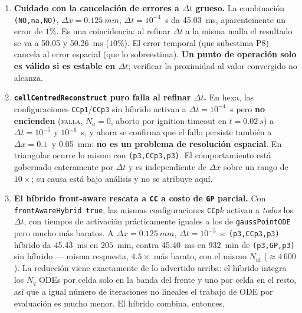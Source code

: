 \documentclass[11pt,a4paper]{article}
\newcommand{\code}[1]{\texttt{\small #1}}
\begin{document}
\begin{enumerate}[topsep=3pt,itemsep=3pt,leftmargin=1.5em]
        del valor convergido. En cambio $\Delta t=10^{-4}$~s \textbf{no} es
        suficiente: subestima P8 en $\sim\SI{4.6}{ms}$ ($10\%$) en la ruta de alto
        orden.
  \item \textbf{Cuidado con la cancelación de errores a $\Delta t$ grueso.} La
        combinación \code{(NO,na,NO)}, $\Delta x=\SI{0.125}{mm}$, $\Delta t=10^{-4}$~s
        da \SI{45.03}{ms}, aparentemente un error de $1\%$. Es una coincidencia: al
        refinar $\Delta t$ a la misma malla el resultado se va a \SI{50.05}{} y
        \SI{50.26}{ms} ($10\%$). El error temporal (que subestima P8) cancela al
        error espacial (que lo sobreestima). \textbf{Un punto de operación solo es
        válido si es estable en $\Delta t$}; verificar la proximidad al valor
        convergido no alcanza.
  \item \textbf{\code{cellCentredReconstruct} puro falla al refinar $\Delta t$.} En
        hexa, las configuraciones \code{CCp1}/\code{CCp3} sin híbrido activan a
        $\Delta t=10^{-4}$~s pero \textbf{no encienden} (\textsc{falla}, $N_a=0$,
        aborto por ignition-timeout en $t=\SI{0.02}{s}$) a $\Delta t=10^{-5}$ y
        $10^{-6}$~s, y ahora se confirma que el fallo persiste también a
        $\Delta x=\SI{0.1}{}$ y \SI{0.05}{mm}: \textbf{no es un problema de
        resolución espacial}. En triangular ocurre lo mismo con \code{(p3,CCp3,p3)}.
        El comportamiento está gobernado enteramente por $\Delta t$ y es
        independiente de $\Delta x$ sobre un rango de $10\times$; su causa está
        bajo análisis y no se atribuye aquí.
  \item \textbf{El híbrido front-aware rescata a \code{CC} a costo de \code{GP}
        parcial.} Con \code{frontAwareHybrid true}, las mismas configuraciones
        \code{CCp$k$} activan a \emph{todos} los $\Delta t$, con tiempos de
        activación prácticamente iguales a los de \code{gaussPointODE} pero mucho más
        baratos. A $\Delta x=\SI{0.125}{mm}$, $\Delta t=10^{-5}$~s:
        \code{(p3,CCp3,p3)} híbrido da \SI{45.43}{ms} en $205$~min, contra
        \SI{45.40}{ms} en $932$~min de \code{(p3,GP,p3)} sin híbrido --- misma
        respuesta, $4.5\times$ más barato, con el mismo $N_{\mathrm{nl}}$
        ($\approx 4\,600$). La reducción viene exactamente de lo advertido arriba: el
        híbrido integra los $N_q$ ODEs por celda solo en la banda del frente y uno
        por celda en el resto, así que a igual número de iteraciones no lineales el
        trabajo de ODE por evaluación es mucho menor. El híbrido combina, entonces,

\end{enumerate}
\end{document}
